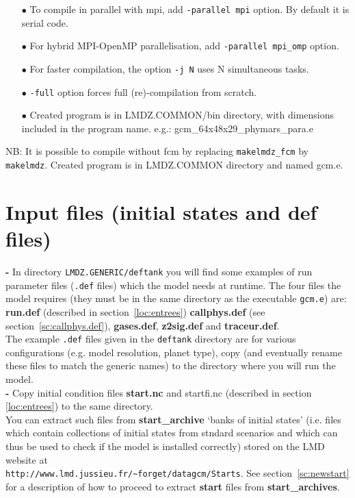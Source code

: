 \begin{enumerate}
\begin{itemize}
\item[$\bullet$] To compile in parallel with mpi, add \verb|-parallel mpi| option. By default it is serial code.
\item[$\bullet$] For hybrid MPI-OpenMP parallelisation, add \verb|-parallel mpi_omp| option.
\item[$\bullet$] For faster compilation, the option \verb|-j N| uses N simultaneous tasks.
\item[$\bullet$] \verb|-full| option forces full (re)-compilation from scratch.
\item[$\bullet$] Created program is in LMDZ.COMMON/bin directory, with dimensions included in the program name. e.g.: gcm\_64x48x29\_phymars\_para.e
\end{itemize}
\end{enumerate}
NB: It is possible to compile without fcm by replacing \verb|makelmdz_fcm| by \verb|makelmdz|. Created program is in LMDZ.COMMON directory and named gcm.e.
\section{Input files (initial states and def files)}
{\bf -} In directory \verb+LMDZ.GENERIC/deftank+
you will find some examples of run
parameter files ({\tt .def} files) which the model needs at runtime.
The four files the model requires (they must be in the same directory as the
executable {\tt gcm.e}) are:
{\bf run.def} (described in
section~\ref{loc:entrees}) {\bf callphys.def}
(see section~\ref{sc:callphys.def}),
{\bf gases.def}, {\bf z2sig.def} and {\bf traceur.def}.\\

The example {\tt .def} files given in the {\tt deftank} directory
are for various configurations (e.g. model resolution, planet type), copy (and eventually
rename these files to match the generic names) to the directory where
you will run the model.\\

\noindent
{\bf -} Copy initial condition files
{\bf start.nc} and {startfi.nc}  (described in section
\ref{loc:entrees}) to the same directory.\\
You can extract such files from {\bf start\_archive}
`banks of initial states' (i.e. files which
contain collections of initial states from
stndard scenarios and which can thus be used
to check if the model is installed correctly) stored on the LMD website at\\
\verb+http://www.lmd.jussieu.fr/~forget/datagcm/Starts+.
See section~\ref{sc:newstart} for a description of how to proceed to
extract {\bf start} files from {\bf start\_archives}.\\

